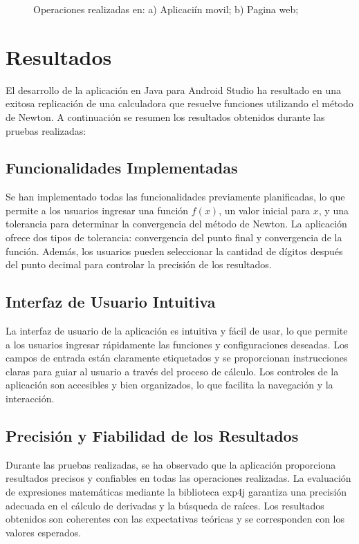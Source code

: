 \documentclass[conference]{IEEEtran}
\begin{document}
\begin{figure}
\caption{Operaciones realizadas en: a) Aplicaciín movil; b) Pagina web;
}
\label{fig:nonlinearity}
\end{figure}


\section{Resultados}

El desarrollo de la aplicación en Java para Android Studio ha resultado en una exitosa replicación de una calculadora que resuelve funciones utilizando el método de Newton. A continuación se resumen los resultados obtenidos durante las pruebas realizadas:

\subsection{Funcionalidades Implementadas}

Se han implementado todas las funcionalidades previamente planificadas, lo que permite a los usuarios ingresar una función \( f(x) \), un valor inicial para \( x \), y una tolerancia para determinar la convergencia del método de Newton. La aplicación ofrece dos tipos de tolerancia: convergencia del punto final y convergencia de la función. Además, los usuarios pueden seleccionar la cantidad de dígitos después del punto decimal para controlar la precisión de los resultados.

\subsection{Interfaz de Usuario Intuitiva}

La interfaz de usuario de la aplicación es intuitiva y fácil de usar, lo que permite a los usuarios ingresar rápidamente las funciones y configuraciones deseadas. Los campos de entrada están claramente etiquetados y se proporcionan instrucciones claras para guiar al usuario a través del proceso de cálculo. Los controles de la aplicación son accesibles y bien organizados, lo que facilita la navegación y la interacción.

\subsection{Precisión y Fiabilidad de los Resultados}

Durante las pruebas realizadas, se ha observado que la aplicación proporciona resultados precisos y confiables en todas las operaciones realizadas. La evaluación de expresiones matemáticas mediante la biblioteca exp4j garantiza una precisión adecuada en el cálculo de derivadas y la búsqueda de raíces. Los resultados obtenidos son coherentes con las expectativas teóricas y se corresponden con los valores esperados.
\end{document}
